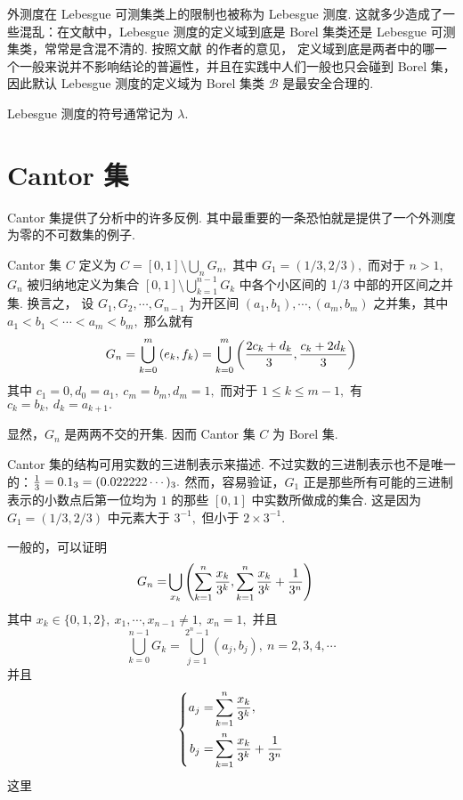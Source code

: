 \documentclass[12pt, a4paper, oneside]{book}
\numberwithin{figure}{section}
\theoremstyle{definition}
\begin{document}
外测度在 Lebesgue 可测集类上的限制也被称为 Lebesgue 测度. 这就多少造成了一些混乱：在文献中，Lebesgue 测度的定义域到底是 Borel 集类还是 Lebesgue 可测集类，常常是含混不清的. 按照文献 \cite{Axler_2020} 的作者的意见，
定义域到底是两者中的哪一个一般来说并不影响结论的普遍性，并且在实践中人们一般也只会碰到 Borel 集，因此默认 Lebesgue 测度的定义域为 Borel 集类 $\mathcal B$ 是最安全合理的.

Lebesgue 测度的符号通常记为 $\lambda.$

\section{Cantor 集}

Cantor 集提供了分析中的许多反例. 其中最重要的一条恐怕就是提供了一个外测度为零的不可数集的例子.

Cantor 集 $C$ 定义为 $C=[0,1]\setminus\bigcup_n G_n,$ 其中 $G_1=(1/3,2/3),$ 而对于 $n>1,$ $G_n$ 被归纳地定义为集合 $[0,1]\setminus\bigcup_{k=1}^{n-1} G_k$ 中各个小区间的 1/3 中部的开区间之并集. 换言之，
设 $G_1,G_2,\cdots,G_{n-1}$ 为开区间 $(a_1,b_1),\cdots,(a_m,b_m)$ 之并集，其中 $a_1<b_1<\cdots<a_m<b_m,$ 那么就有
\begin{equation}\label{Cantor set induction def}
    G_n=\bigcup_{k=0}^{m} \left(e_k,f_k\right)=\bigcup_{k=0}^{m} \left({2c_k+d_k\over 3},{c_k+2d_k\over 3}\right)
\end{equation}
其中 $c_1=0, d_0=a_1,\ c_m=b_m, d_{m}=1,$ 而对于 $1\leq k\leq m-1,$ 有 $c_k=b_k,\ d_k=a_{k+1}.$

显然，$G_n$ 是两两不交的开集. 因而 Cantor 集 $C$ 为 Borel 集.

Cantor 集的结构可用实数的三进制表示来描述. 不过实数的三进制表示也不是唯一的：${1\over 3}=0.1_3=(0.022222\cdots)_3.$ 然而，容易验证，$G_1$ 正是那些所有可能的三进制表示的小数点后第一位均为 $1$ 的那些 $[0,1]$ 中实数所做成的集合. 这是因为 $G_1=(1/3,2/3)$ 中元素大于 $3^{-1},$ 但小于 $2\times 3^{-1}.$ 

一般的，可以证明
\begin{equation}\label{structure of Cantor set}
    \begin{aligned}
        G_n =& \bigcup_{x_k}\left(\sum_{k=1}^{n} {x_k\over 3^k}, \sum_{k=1}^{n} {x_k\over 3^k}+{1\over 3^{n}}\right)
    \end{aligned}
\end{equation}
其中 $x_k\in\{0,1,2\},\ x_1,\cdots,x_{n-1}\neq 1,\ x_n=1,$ 并且
\begin{equation}
    \bigcup_{k=0}^{n-1} G_k = \bigcup_{j=1}^{2^n-1}(a_j,b_j),\ n=2,3,4,\cdots
\end{equation}
并且 
\begin{equation}
    \left\{
        \begin{aligned}
            a_j =& \sum_{k=1}^{n} {x_k\over 3^k},\\
            b_j =& \sum_{k=1}^{n} {x_k\over 3^k}+{1\over 3^{n}}
        \end{aligned}
    \right.
\end{equation}
这里 
\end{document}
